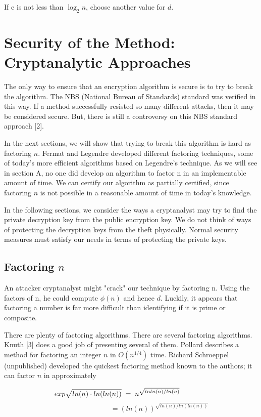 \documentclass[12pt, letterpaper]{article}
\begin{document}
If e is not less than $\log_2 n$, choose another value for $d$.

\section{Security of the Method: Cryptanalytic Approaches}


The only way to ensure that an encryption algorithm is secure is to try to break the algorithm. The NBS (National Bureau of Standards) standard was verified in this way. If a method successfully resisted so many different attacks, then it may be considered secure. But, there is still a controversy on this NBS standard approach [2].

In the next sections, we will show that trying to break this algorithm is hard as factoring $n$.  Fermat and Legendre developed different factoring techniques, some of today's more efficient algorithms based on Legendre’s technique. As we will see in section A, no one did develop an algorithm to factor n in an implementable amount of time. We can certify our algorithm as partially certified, since factoring $n$ is not possible in a reasonable amount of time in today’s knowledge.

In the following sections, we consider the ways a cryptanalyst may try to find the private decryption key from the public encryption key. We do not think of ways of protecting the decryption keys from the theft physically. Normal security measures must satisfy our needs in terms of protecting the private keys.

\subsection{Factoring $n$}

An attacker cryptanalyst might "crack" our technique by factoring n. Using the factors of n, he could compute $\phi(n)$ and hence $d$. Luckily, it appears that factoring a number is far more difficult than identifying if it is prime or composite.

There are plenty of factoring algorithms. There are several factoring algorithms. Knuth [3] does a good job of presenting several of them. Pollard describes a method for factoring an integer $n$ in $O(n^{1/4})$ time. Richard Schroeppel (unpublished) developed the quickest factoring method known to the authors; it can factor $n$ in approximately

\[ \mkern-18mu \mkern-18mu \mkern-18mu \mkern-18mu exp \sqrt{ln(n) \cdot ln(ln(n))} \; = \; n^{\sqrt{ln ln(n)/ ln(n)}} \]
\[ \qquad \qquad \qquad \qquad = (ln(n))^{\sqrt{ln(n)/ ln(ln(n))}} \]
\end{document}
